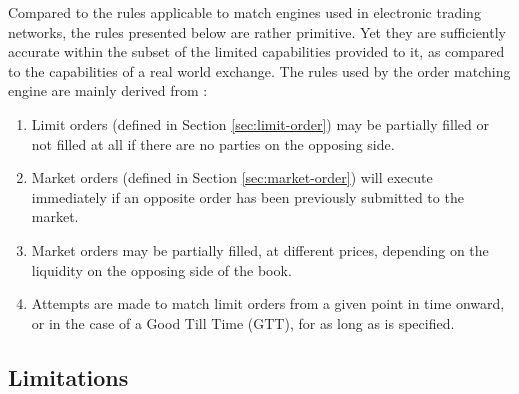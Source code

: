 Compared to the rules applicable to match engines used in electronic trading networks, the rules presented below are rather primitive. Yet they are sufficiently accurate within the subset of the limited capabilities provided to it, as compared to the capabilities of a real world exchange.
The rules used by the order matching engine are mainly derived from \cite{match-engine}:
\begin{enumerate}
    \item Limit orders (defined in Section \ref{sec:limit-order}) may be partially filled or not filled at all if there are no parties on the opposing side.
    
    \item Market orders (defined in Section \ref{sec:market-order}) will execute immediately if an opposite order has been previously submitted to the market.
    
    \item Market orders may be partially filled, at different prices, depending on the liquidity on the opposing side of the book.
    
    \item Attempts are made to match limit orders from a given point in time onward, or in the case of a Good Till Time (GTT), for as long as is specified.
\end{enumerate}


\subsection{Limitations}

